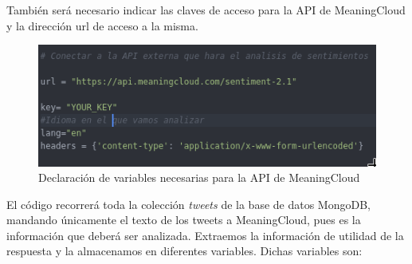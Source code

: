 También será necesario indicar las claves de acceso para la API de MeaningCloud y la dirección url de acceso a la misma. 


\begin{figure}[H]
	\centering
	\includegraphics[scale=.35]{imagenes/key-analisis.png}
	\caption{Declaración de variables necesarias para la API de MeaningCloud}
	\label{fig:key-analisis}
\end{figure}




El código recorrerá toda la colección \textit{tweets} de la base de datos MongoDB, mandando únicamente el texto de los tweets a MeaningCloud, pues es la información que deberá ser analizada. Extraemos la información de utilidad de la respuesta y la almacenamos en diferentes variables. Dichas variables son:

